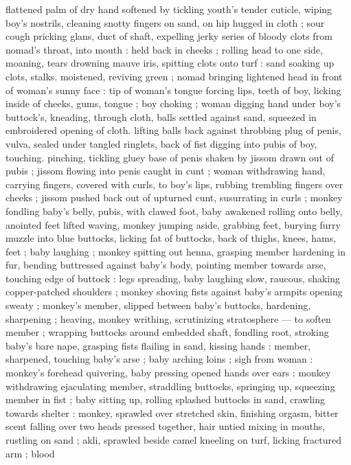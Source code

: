 flattened palm of dry hand softened by tickling youth's tender 
cuticle, wiping boy's nostrils, cleaning snotty fingers on sand, on hip 
hugged in cloth ; sour cough pricking glans, duct of shaft, expelling 
jerky series of bloody clots from nomad's throat, into mouth : held 
back in cheeks ; rolling head to one side, moaning, tears drowning 
mauve iris, spitting clots onto turf : sand soaking up clots, stalks. 
moistened, reviving green ; nomad bringing lightened head in front 
of woman's sunny face : tip of woman's tongue forcing lips, teeth of 
boy, licking inside of cheeks, gums, tongue ; boy choking ; woman 
digging hand under boy's buttock's, kneading, through cloth, balls 
settled against sand, squeezed in embroidered opening of cloth. 
lifting balls back against throbbing plug of penis, vulva, sealed under 
tangled ringlets, back of fist digging into pubis of boy, touching. 
pinching, tickling gluey base of penis shaken by jissom drawn out of 
pubis ; jissom flowing into penis caught in cunt ; woman withdrawing 
hand, carrying fingers, covered with curls, to boy's lips, rubbing 
trembling fingers over cheeks ; jissom pushed back out of upturned 
cunt, susurrating in curls ; monkey fondling baby's belly, pubis, with 
clawed foot, baby awakened rolling onto belly, anointed feet lifted 
waving, monkey jumping aside, grabbing feet, burying furry muzzle 
into blue buttocks, licking fat of buttocks, back of thighs, knees, 
hams, feet ; baby laughing ; monkey spitting out henna, grasping 
member hardening in fur, bending buttressed against baby's body, 
pointing member towards arse, touching edge of buttock : legs 
spreading, baby laughing slow, raucous, shaking copper-patched 
shoulders ; monkey shoving fists against baby's armpits opening 
sweaty ; monkey's member, slipped between baby's buttocks, 
hardening, sharpening ; heaving, monkey writhing, scrutinizing 
stratosphere --- to soften member ; wrapping buttocks around 
embedded shaft, fondling root, stroking baby's bare nape, grasping 
fists flailing in sand, kissing hands : member, sharpened, touching 
baby's arse ; baby arching loins ; sigh from woman : monkey's 
forehead quivering, baby pressing opened hands over ears : monkey 
withdrawing ejaculating member, straddling buttocks, springing up, 
squeezing member in fist ; baby sitting up, rolling splashed buttocks 
in sand, crawling towards shelter : monkey, sprawled over stretched 
skin, finishing orgasm, bitter scent falling over two heads pressed 
together, hair untied mixing in mouths, rustling on sand ; akli, 
sprawled beside camel kneeling on turf, licking fractured arm ; blood 
